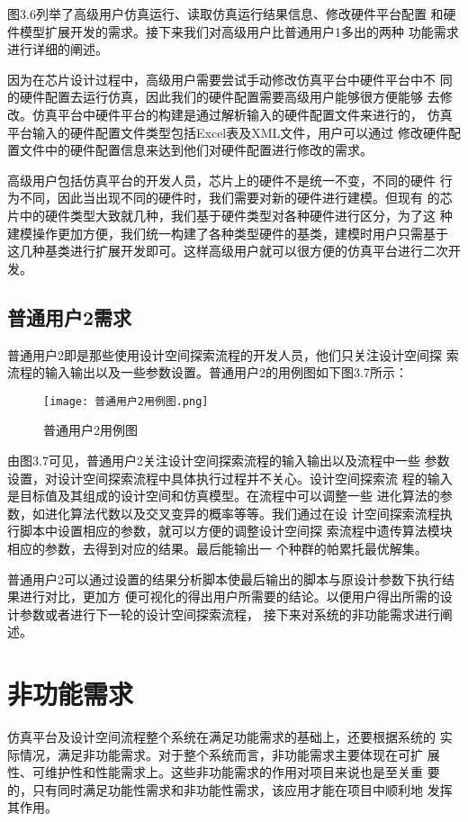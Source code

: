 图3.6列举了高级用户仿真运行、读取仿真运行结果信息、修改硬件平台配置
和硬件模型扩展开发的需求。接下来我们对高级用户比普通用户1多出的两种
功能需求进行详细的阐述。

因为在芯片设计过程中，高级用户需要尝试手动修改仿真平台中硬件平台中不
同的硬件配置去运行仿真，因此我们的硬件配置需要高级用户能够很方便能够
去修改。仿真平台中硬件平台的构建是通过解析输入的硬件配置文件来进行的，
仿真平台输入的硬件配置文件类型包括Excel表及XML文件，用户可以通过
修改硬件配置文件中的硬件配置信息来达到他们对硬件配置进行修改的需求。

高级用户包括仿真平台的开发人员，芯片上的硬件不是统一不变，不同的硬件
行为不同，因此当出现不同的硬件时，我们需要对新的硬件进行建模。但现有
的芯片中的硬件类型大致就几种，我们基于硬件类型对各种硬件进行区分，为了这
种建模操作更加方便，我们统一构建了各种类型硬件的基类，建模时用户只需基于
这几种基类进行扩展开发即可。这样高级用户就可以很方便的仿真平台进行二次开发。

\subsection{普通用户2需求}
普通用户2即是那些使用设计空间探索流程的开发人员，他们只关注设计空间探
索流程的输入输出以及一些参数设置。普通用户2的用例图如下图3.7所示：

\begin{figure}[h]
    \centering
    \texttt{[image: 普通用户2用例图.png]}
    \caption{普通用户2用例图}
    \label{fig:badge}
\end{figure}

由图3.7可见，普通用户2关注设计空间探索流程的输入输出以及流程中一些
参数设置，对设计空间探索流程中具体执行过程并不关心。设计空间探索流
程的输入是目标值及其组成的设计空间和仿真模型。在流程中可以调整一些
进化算法的参数，如进化算法代数以及交叉变异的概率等等。我们通过在设
计空间探索流程执行脚本中设置相应的参数，就可以方便的调整设计空间探
索流程中遗传算法模块相应的参数，去得到对应的结果。最后能输出一
个种群的帕累托最优解集。

普通用户2可以通过设置的结果分析脚本使最后输出的脚本与原设计参数下执行结果进行对比，更加方
便可视化的得出用户所需要的结论。以便用户得出所需的设计参数或者进行下一轮的设计空间探索流程，
接下来对系统的非功能需求进行阐述。

\section{非功能需求}
仿真平台及设计空间流程整个系统在满足功能需求的基础上，还要根据系统的
实际情况，满足非功能需求。对于整个系统而言，非功能需求主要体现在可扩
展性、可维护性和性能需求上。这些非功能需求的作用对项目来说也是至关重
要的，只有同时满足功能性需求和非功能性需求，该应用才能在项目中顺利地
发挥其作用。

